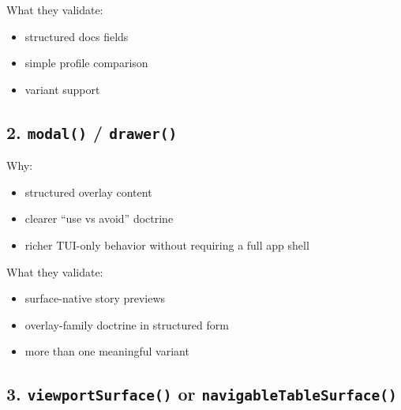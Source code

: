 What they validate:

\begin{itemize}
\tightlist
\item
  structured docs fields
\item
  simple profile comparison
\item
  variant support
\end{itemize}

\subsection{\texorpdfstring{2. \texttt{m\allowbreak{}o\allowbreak{}d\allowbreak{}a\allowbreak{}l\allowbreak{}(\allowbreak{})} / \texttt{d\allowbreak{}r\allowbreak{}a\allowbreak{}w\allowbreak{}e\allowbreak{}r\allowbreak{}(\allowbreak{})}}{2.  / }}\label{record-039-modal-drawer}

Why:

\begin{itemize}
\tightlist
\item
  structured overlay content
\item
  clearer ``use vs avoid'' doctrine
\item
  richer TUI-only behavior without requiring a full app shell
\end{itemize}

What they validate:

\begin{itemize}
\tightlist
\item
  surface-native story previews
\item
  overlay-family doctrine in structured form
\item
  more than one meaningful variant
\end{itemize}

\subsection{\texorpdfstring{3. \texttt{v\allowbreak{}i\allowbreak{}e\allowbreak{}w\allowbreak{}p\allowbreak{}o\allowbreak{}r\allowbreak{}t\allowbreak{}S\allowbreak{}u\allowbreak{}r\allowbreak{}f\allowbreak{}a\allowbreak{}c\allowbreak{}e\allowbreak{}(\allowbreak{})} or \texttt{n\allowbreak{}a\allowbreak{}v\allowbreak{}i\allowbreak{}g\allowbreak{}a\allowbreak{}b\allowbreak{}l\allowbreak{}e\allowbreak{}T\allowbreak{}a\allowbreak{}b\allowbreak{}l\allowbreak{}e\allowbreak{}S\allowbreak{}u\allowbreak{}r\allowbreak{}f\allowbreak{}a\allowbreak{}c\allowbreak{}e\allowbreak{}(\allowbreak{})}}{3.  or }}\label{record-039-viewportsurface-or-navigabletablesurface}

